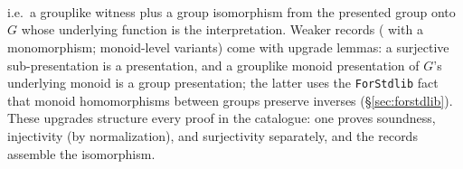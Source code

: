 \begin{code}[hide]%
\>[0]\<%
\\
\>[0][@{}l@{\AgdaIndent{0}}]%
\>[2]%
\>[13]\AgdaSymbol{:}\AgdaSpace{}%
\<%
\\
%
\>[2]%
\>[13]\AgdaSymbol{:}\AgdaSpace{}%
\AgdaSpace{}%
\AgdaSpace{}%
\AgdaSpace{}%
\<%
\\
%
\>[2]%
\>[13]\AgdaSymbol{:}\AgdaSpace{}%
\AgdaSpace{}%
\AgdaSpace{}%
\AgdaSpace{}%
\AgdaSpace{}%
\<%
\\
%
\>[2]\AgdaSpace{}%
\AgdaSymbol{:}\AgdaSpace{}%
\<%
\\
%
\>[2]%
\>[13]\AgdaSymbol{:}\AgdaSpace{}%
\AgdaSpace{}%
\AgdaSpace{}%
\AgdaSpace{}%
\<%
\\
%
\>[2]%
\>[13]\AgdaSymbol{:}\AgdaSpace{}%
\<%
\\
%
\>[2]%
\>[13]\AgdaSymbol{:}\AgdaSpace{}%
\AgdaSpace{}%
\AgdaSpace{}%
\AgdaSpace{}%
\<%
\\
%
\>[2]%
\>[13]\AgdaSymbol{:}\AgdaSpace{}%
\AgdaSpace{}%
\AgdaSpace{}%
\AgdaSpace{}%
\AgdaSpace{}%
\<%
\end{code}

\noindent i.e.\ a grouplike witness plus a group isomorphism from the presented
group onto $G$ whose underlying function is the interpretation.  Weaker
records ( with a monomorphism;
monoid-level variants) come with upgrade lemmas: a surjective
sub-presentation is a presentation, and a grouplike monoid presentation of
$G$'s underlying monoid is a group presentation; the latter uses the
\texttt{ForStdlib} fact that monoid homomorphisms between groups preserve
inverses (\S\ref{sec:forstdlib}).  These upgrades structure every proof in
the catalogue: one proves soundness, injectivity (by normalization), and
surjectivity separately, and the records assemble the isomorphism.


